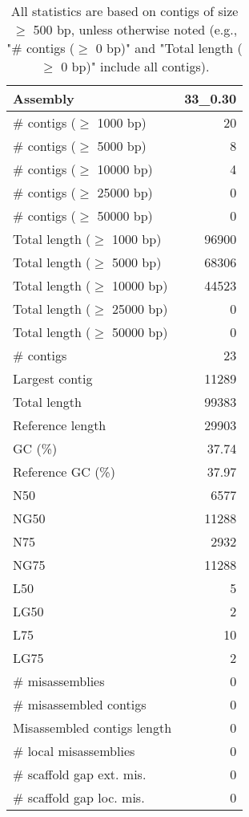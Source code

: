 \documentclass[12pt,a4paper]{article}
\begin{document}
\begin{table}[ht]
\begin{center}
\caption{All statistics are based on contigs of size $\geq$ 500 bp, unless otherwise noted (e.g., "\# contigs ($\geq$ 0 bp)" and "Total length ($\geq$ 0 bp)" include all contigs).}
\begin{tabular}{|l*{1}{|r}|}
\hline
Assembly & 33\_0.30 \\ \hline
\# contigs ($\geq$ 1000 bp) & 20 \\ \hline
\# contigs ($\geq$ 5000 bp) & 8 \\ \hline
\# contigs ($\geq$ 10000 bp) & 4 \\ \hline
\# contigs ($\geq$ 25000 bp) & 0 \\ \hline
\# contigs ($\geq$ 50000 bp) & 0 \\ \hline
Total length ($\geq$ 1000 bp) & 96900 \\ \hline
Total length ($\geq$ 5000 bp) & 68306 \\ \hline
Total length ($\geq$ 10000 bp) & 44523 \\ \hline
Total length ($\geq$ 25000 bp) & 0 \\ \hline
Total length ($\geq$ 50000 bp) & 0 \\ \hline
\# contigs & 23 \\ \hline
Largest contig & 11289 \\ \hline
Total length & 99383 \\ \hline
Reference length & 29903 \\ \hline
GC (\%) & 37.74 \\ \hline
Reference GC (\%) & 37.97 \\ \hline
N50 & 6577 \\ \hline
NG50 & 11288 \\ \hline
N75 & 2932 \\ \hline
NG75 & 11288 \\ \hline
L50 & 5 \\ \hline
LG50 & 2 \\ \hline
L75 & 10 \\ \hline
LG75 & 2 \\ \hline
\# misassemblies & 0 \\ \hline
\# misassembled contigs & 0 \\ \hline
Misassembled contigs length & 0 \\ \hline
\# local misassemblies & 0 \\ \hline
\# scaffold gap ext. mis. & 0 \\ \hline
\# scaffold gap loc. mis. & 0 \\ \hline

\end{tabular}
\end{center}
\end{table}
\end{document}
